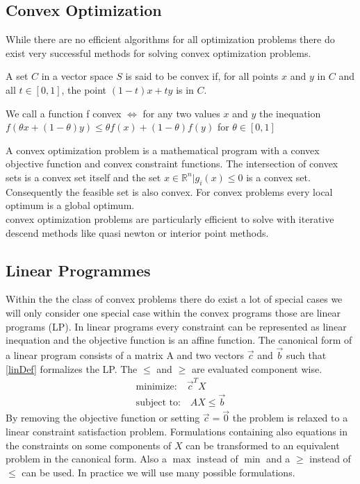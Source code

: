 \subsection{Convex Optimization}
While there are no efficient algorithms for all optimization problems there do exist very successful methods for solving convex optimization problems\cite{Boyd04ConOpt}.
\begin{definition}
A set $C$ in a vector space $S$ is said to be convex if, for all points $x$ and $y$ in $C$ and all $t\in\left[0,1\right]$, the point $(1-t)x+ty$ is in $C$.
\end{definition}
\begin{definition}
We call a function f convex $\iff$ for any two values $x$ and $y$ the inequation $ f(\theta x + (1-\theta) y)\leq \theta f(x)+(1-\theta) f(y)$ for $\theta\in \left[0,1\right] $
\end{definition}
A convex optimization problem is a mathematical program with a convex objective function and convex constraint functions. The intersection of convex sets is a convex set itself and the set ${x\in\mathbb{R}^n|g_i(x)\leq 0}$ is a convex set. Consequently the feasible set is also convex. For convex problems every local optimum is a global optimum.\\

convex optimization problems are particularly efficient to solve with iterative descend methods like quasi newton or interior point methods.\\

\subsection{Linear Programmes}
Within the the class of convex problems there do exist a lot of special cases we will only consider one special case within the convex programs those are linear programs (LP).
In linear programs every constraint can be represented as linear inequation and the objective function is an affine function. 
The canonical form of a linear program consists of a matrix $\mathrm{A}$ and two vectors $\vec{c}$ and $\vec{b}$ such that \ref{linDef} formalizes the LP. The $\leq$ and $\geq$ are evaluated component wise.
\begin{eqnarray}
\label{linDef}
\text{minimize:}\quad \vec{c}^TX \\
\text{subject to:}\quad AX\leq\vec{b}
\end{eqnarray}
By removing the objective function or setting $\vec{c}=\vec{0}$ the problem is relaxed to a linear constraint satisfaction problem. Formulations containing also equations in the constraints on some components of $X$ can be transformed to an equivalent problem in the canonical form. Also a $\max$ instead of $\min$ and a $\geq$ instead of $\leq$ can be used. In practice we will use many possible formulations.\\

